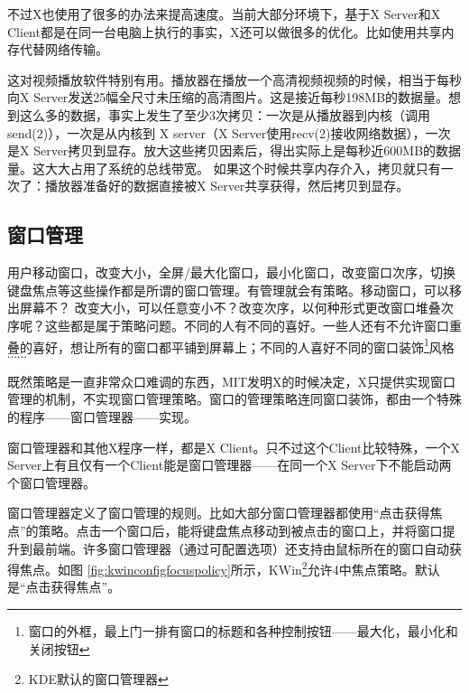 不过X也使用了很多的办法来提高速度。当前大部分环境下，基于X Server和X Client都是在同一台电脑上执行的事实，X还可以做很多的优化。比如使用共享内存代替网络传输。

\begin{notice}


这对视频播放软件特别有用。播放器在播放一个高清视频视频的时候，相当于每秒向X Server发送25幅全尺寸未压缩的高清图片。这是接近每秒198MB的数据量。想到这么多的数据，事实上发生了至少3次拷贝：一次是从播放器到内核（调用send(2)），一次是从内核到
X server（X Server使用recv(2)接收网络数据），一次是X Server拷贝到显存。放大这些拷贝因素后，得出实际上是每秒近600MB的数据量。这大大占用了系统的总线带宽。
如果这个时候共享内存介入，拷贝就只有一次了：播放器准备好的数据直接被X Server共享获得，然后拷贝到显存。



\end{notice}

\subsection{窗口管理}

用户移动窗口，改变大小，全屏/最大化窗口，最小化窗口，改变窗口次序，切换键盘焦点等这些操作都是所谓的窗口管理。有管理就会有策略。移动窗口，可以移出屏幕不？
改变大小，可以任意变小不？改变次序，以何种形式更改窗口堆叠次序呢？这些都是属于策略问题。不同的人有不同的喜好。一些人还有不允许窗口重叠的喜好，想让所有的窗口都平铺到屏幕上；不同的人喜好不同的窗口装饰\footnote{窗口的外框，最上门一排有窗口的标题和各种控制按钮——最大化，最小化和关闭按钮}风格$\cdots\cdots$

既然策略是一直非常众口难调的东西，MIT发明X的时候决定，X只提供实现窗口管理的机制，不实现窗口管理策略。窗口的管理策略连同窗口装饰，都由一个特殊的程序——窗口管理器——实现。

窗口管理器和其他X程序一样，都是X Client。只不过这个Client比较特殊，一个X Server上有且仅有一个Client能是窗口管理器——在同一个X Server下不能启动两个窗口管理器。


窗口管理器定义了窗口管理的规则。比如大部分窗口管理器都使用“点击获得焦点”的策略。点击一个窗口后，能将键盘焦点移动到被点击的窗口上，并将窗口提升到最前端。许多窗口管理器（通过可配置选项）还支持由鼠标所在的窗口自动获得焦点。如图 \ref{fig:kwinconfigfocuspolicy}所示，KWin\footnote{KDE默认的窗口管理器}允许4中焦点策略。默认是“点击获得焦点”。

